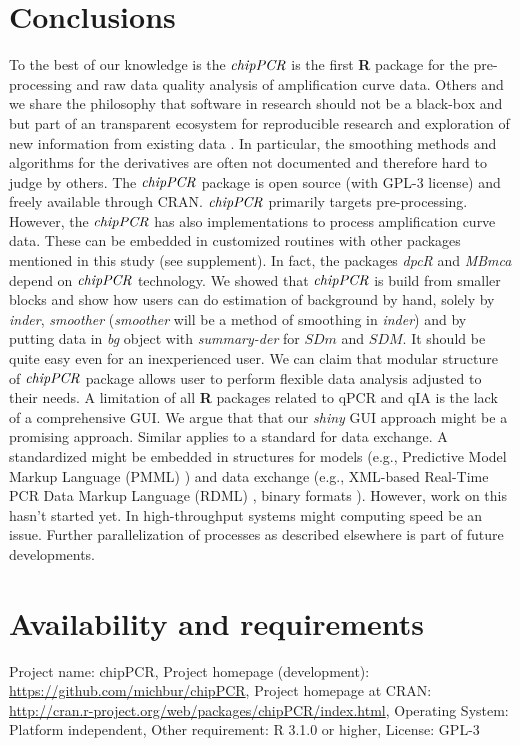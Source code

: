 \documentclass[twocolumn]{bmcart}%
\begin{document}
\section*{Conclusions}

To the best of our knowledge is the $\emph{chipPCR}$ is the first \textbf{R} 
package for the pre-processing and raw data quality analysis of amplification 
curve data. Others and we share the philosophy that software in research should 
not be a black-box and but part of an transparent ecosystem for reproducible 
research and exploration of new information from existing data 
\cite{roediger_RJ_2013, hofmann_2013, Leeper_2014,Thioulouse_2010,liu_2014}. 
In particular, the smoothing methods and algorithms for the derivatives are 
often not documented and therefore hard to judge by others. The $\emph{chipPCR}$ 
package is open source (with GPL-3 license) and freely available through CRAN. 
$\emph{chipPCR}$ primarily targets pre-processing. However, the $\emph{chipPCR}$ 
has also implementations to process amplification curve data. These can be 
embedded in customized routines with other packages mentioned in this study 
(see supplement). In fact, the packages \emph{dpcR} and \emph{MBmca} depend on 
$\emph{chipPCR}$ technology. We showed that $\emph{chipPCR}$ is build from 
smaller blocks and show how users can do estimation of background by hand, 
solely by \textsl{inder}, \textsl{smoother} (\textsl{smoother} will be a method 
of smoothing in \textsl{inder}) and by putting data in \textsl{bg} object with 
\textsl{summary-der} for $SDm$ and $SDM$. It should be quite easy even for an 
inexperienced user. We can claim that modular structure of $\emph{chipPCR}$ 
package allows user to perform flexible data analysis adjusted to their needs. A 
limitation of all \textbf{R} packages related to qPCR and qIA is the lack of a 
comprehensive GUI. We argue that that our \emph{shiny} GUI approach might be a 
promising approach. Similar applies to a standard for data exchange. A 
standardized might be embedded in structures for models (e.g., Predictive Model 
Markup Language (PMML) \cite{Guazzelli_2009}) and data exchange (e.g., XML-based 
Real-Time PCR Data Markup Language (RDML) 
\cite{blagodatskikh_2014,lefever_2009}, binary formats \cite{michna_2013}). 
However, work on this hasn't started yet. In high-throughput systems might 
computing speed be an issue. Further parallelization of 
processes as described elsewhere \cite{Schmidberger_2009, boehringer_2013} is 
part of future developments. 

\section*{Availability and requirements}
Project name: chipPCR, 
Project homepage (development):
\url{https://github.com/michbur/chipPCR}, 
Project homepage at CRAN: 
\url{http://cran.r-project.org/web/packages/chipPCR/index.html}, 
Operating System: Platform independent, 
Other requirement: R 3.1.0 or higher, 
License: GPL-3
\end{document}
